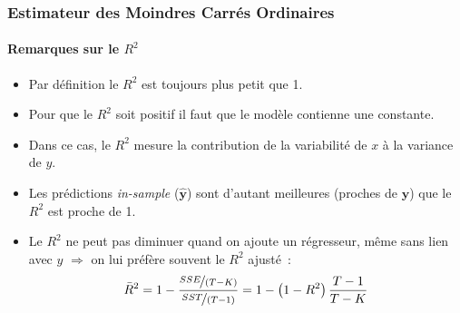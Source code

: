 \documentclass[10pt]{beamer}
\begin{document}
\begin{frame}
  \frametitle{Estimateur des Moindres Carrés Ordinaires}
  \framesubtitle {Remarques sur le  $R^2$}

  \begin{itemize}

  \item Par définition le $R^2$ est toujours plus petit que 1.\newline

  \item Pour que le $R^2$ soit positif il faut que le modèle contienne
    une constante.\newline

  \item Dans ce cas, le $R^2$ mesure la contribution de la variabilité de $x$ à la variance de $y$.\newline

  \item Les prédictions \textit{in-sample} ($\hat{\mathbf y}$) sont d'autant meilleures (proches de $\mathbf y$) que le $R^2$ est proche de 1.\newline

  \item Le $R^2$ ne peut pas diminuer quand on ajoute un régresseur, même sans lien
    avec $y$ $\Rightarrow$ on lui préfère souvent le $R^2$ ajusté~:
    \[
      \bar R^2 = 1 - \frac{\nicefrac{SSE}{(T-K)}}{\nicefrac{SST}{(T-1)}}
               = 1 - \left( 1-R^2 \right)\frac{T-1}{T-K}
    \]

  \end{itemize}

\end{frame}
\end{document}
